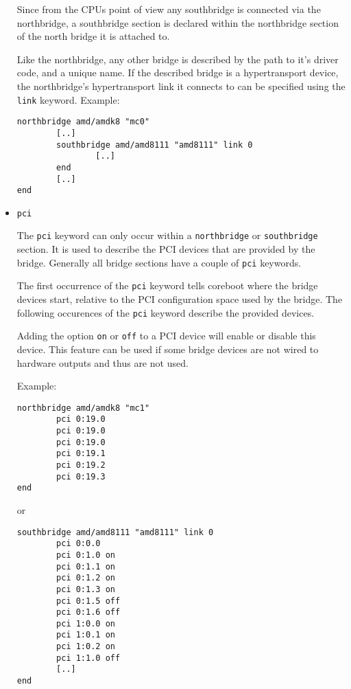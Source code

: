 \documentclass[titlepage,12pt]{article}
\begin{document}
\begin{itemize}
Since from the CPUs point of view any southbridge is connected via the
northbridge, a southbridge section is declared within the northbridge
section of the north bridge it is attached to.

Like the northbridge, any other bridge is described by the path to it's
driver code, and a unique name. If the described bridge is a
hypertransport device, the northbridge's hypertransport link it connects
to can be specified using the \texttt{link} keyword. Example:

\begin{verbatim}
northbridge amd/amdk8 "mc0"
        [..]
        southbridge amd/amd8111 "amd8111" link 0
                [..]
        end
        [..]
end
\end{verbatim}

\item \begin{verbatim}pci\end{verbatim}

The \texttt{pci} keyword can only occur within a \texttt{northbridge} or
\texttt{southbridge} section. It is used to describe the PCI devices
that are provided by the bridge.  Generally all bridge sections have a
couple of \texttt{pci} keywords.

The first occurrence of the \texttt{pci} keyword tells coreboot where
the bridge devices start, relative to the PCI configuration space used
by the bridge. The following occurences of the \texttt{pci} keyword
describe the provided devices.

Adding the option \texttt{on} or \texttt{off} to a PCI device will
enable or disable this device. This feature can be used if some bridge
devices are not wired to hardware outputs and thus are not used.

Example:

\begin{verbatim}
northbridge amd/amdk8 "mc1"
        pci 0:19.0
        pci 0:19.0
        pci 0:19.0
        pci 0:19.1
        pci 0:19.2
        pci 0:19.3
end
\end{verbatim}

or

\begin{verbatim}
southbridge amd/amd8111 "amd8111" link 0
        pci 0:0.0
        pci 0:1.0 on
        pci 0:1.1 on
        pci 0:1.2 on
        pci 0:1.3 on
        pci 0:1.5 off
        pci 0:1.6 off
        pci 1:0.0 on
        pci 1:0.1 on
        pci 1:0.2 on
        pci 1:1.0 off
        [..]
end
\end{verbatim}


\end{itemize}
\end{document}
